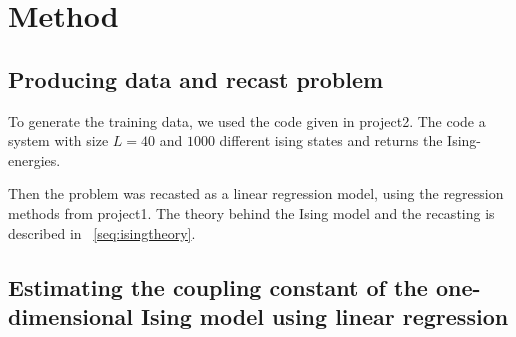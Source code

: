 \section{Method}

\subsection{Producing data and recast problem}
To generate the training data, we used the code given in 
project2. 
The code a system with size \(L=40\) and \(1000\) different 
ising states and returns the Ising-energies. 

Then the problem was recasted as a linear regression model, using 
the regression methods from project1. The theory behind 
the Ising model and the recasting is described in ~\ref{seq:isingtheory}.

\subsection{Estimating the coupling constant of the one-dimensional Ising model using linear regression}







